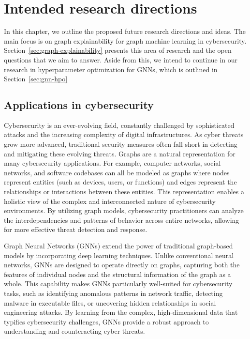 \chapter{Intended research directions}
\label{chap:future}

In this chapter, we outline the proposed future research directions and ideas. The main focus is on graph explainability for graph machine learning in cybersecurity. Section~\ref{sec:graph-explainability} presents this area of research and the open questions that we aim to answer. Aside from this, we intend to continue in our research in hyperparameter optimization for GNNs, which is outlined in Section~\ref{sec:gnn-hpo}

\section{Applications in cybersecurity}

Cybersecurity is an ever-evolving field, constantly challenged by sophisticated attacks and the increasing complexity of digital infrastructures. As cyber threats grow more advanced, traditional security measures often fall short in detecting and mitigating these evolving threats. Graphs are a natural representation for many cybersecurity applications. For example, computer networks, social networks, and software codebases can all be modeled as graphs where nodes represent entities (such as devices, users, or functions) and edges represent the relationships or interactions between these entities. This representation enables a holistic view of the complex and interconnected nature of cybersecurity environments. By utilizing graph models, cybersecurity practitioners can analyze the interdependencies and patterns of behavior across entire networks, allowing for more effective threat detection and response.

Graph Neural Networks (GNNs) extend the power of traditional graph-based models by incorporating deep learning techniques. Unlike conventional neural networks, GNNs are designed to operate directly on graphs, capturing both the features of individual nodes and the structural information of the graph as a whole. This capability makes GNNs particularly well-suited for cybersecurity tasks, such as identifying anomalous patterns in network traffic, detecting malware in executable files, or uncovering hidden relationships in social engineering attacks. By learning from the complex, high-dimensional data that typifies cybersecurity challenges, GNNs provide a robust approach to understanding and counteracting cyber threats.

